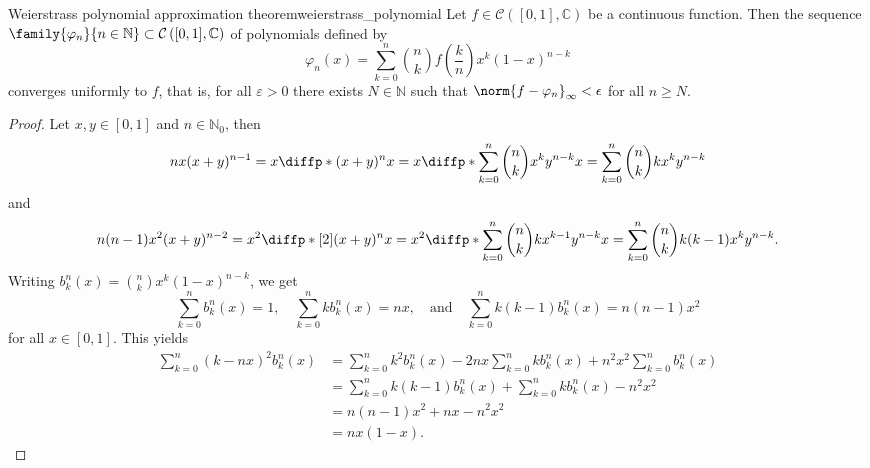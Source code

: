 \begin{theorem}{Weierstrass polynomial approximation theorem}{weierstrass_polynomial}
    Let \(f \in \mathcal{C}\left([0,1], \mathbb{C}\right)\) be a continuous function. Then the sequence \(\family{\varphi_n}{n \in \mathbb{N}}\subset\mathcal{C}\left([0,1], \mathbb{C}\right)\) of polynomials defined by
    \begin{equation*}
        \varphi_n(x) = \sum_{k = 0}^n \binom{n}{k} f\left(\frac{k}{n}\right) x^k (1 - x)^{n - k}
    \end{equation*}
    converges uniformly to \(f\), that is, for all \(\varepsilon > 0\) there exists \(N \in \mathbb{N}\) such that \(\norm{f - \varphi_n}_\infty < \epsilon\) for all \(n \geq N\).
\end{theorem}
\begin{proof}
    Let \(x, y \in [0,1]\) and \(n \in \mathbb{N}_0\), then
    \begin{equation*}
        nx(x + y)^{n-1} = x\diffp*{(x + y)^n}{x} = x\diffp*{\sum_{k = 0}^n\binom{n}{k} x^k y^{n-k}}{x} = \sum_{k=0}^n \binom{n}{k} k x^{k}y^{n - k}
    \end{equation*}
    and
    \begin{equation*}
        n(n-1)x^2(x + y)^{n-2} = x^2\diffp*[2]{(x + y)^n}{x} = x^2\diffp*{ \sum_{k=0}^n \binom{n}{k} k x^{k-1}y^{n - k}}{x} =  \sum_{k = 0}^n \binom{n}{k} k (k-1) x^{k} y^{n - k}.
    \end{equation*}
    Writing \(b^n_k(x) = \binom{n}{k} x^k (1 - x)^{n - k}\), we get
    \begin{equation*}
        \sum_{k = 0}^n b^n_k(x) = 1,
        \quad
        \sum_{k=0}^n k b^n_k(x) = n x,
        \quad\text{and}\quad
        \sum_{k=0}^n k(k-1) b^n_k(x) = n(n-1)x^2
    \end{equation*}
    for all \(x \in [0,1]\). This yields
    \begin{align*}
        \sum_{k = 0}^n (k - nx)^2 b^n_k(x) &= \sum_{k = 0}^n k^2 b^n_k(x) - 2nx\sum_{k=0}^n kb^n_k(x) + n^2 x^2 \sum_{k = 0}^n b^n_k(x)\\
                                           &= \sum_{k = 0}^n k(k-1) b^n_k(x) + \sum_{k=0}^n k b^n_k(x) - n^2 x^2 \\
                                           &= n(n-1)x^2 + nx - n^2x^2\\
                                           &= nx(1 - x).
    \end{align*}


\end{proof}
